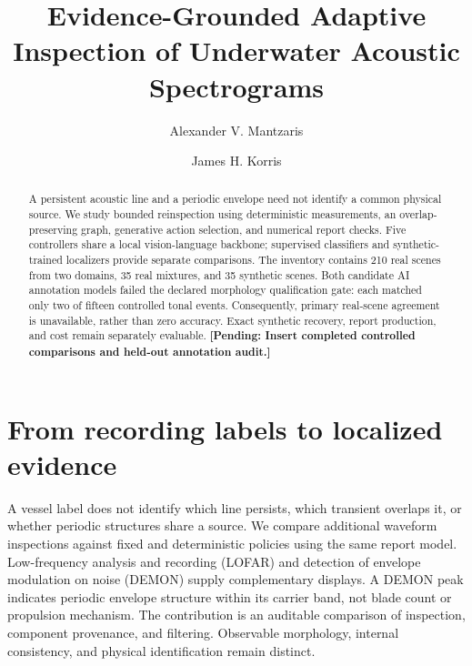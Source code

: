 \documentclass[runningheads,orivec]{llncs}
\newcommand{\pending}[1]{\iffinalresults
  \PackageError{research-results}{Unresolved result or protocol marker}{Resolve the marked item from recorded evidence before submission.}%
  \else\textbf{[Pending: #1]}\fi}
\newif\iffinalresults
\begin{document}
\raggedbottom
\title{Evidence-Grounded Adaptive Inspection of Underwater Acoustic Spectrograms}
\author{Alexander V. Mantzaris \and James H. Korris}
\maketitle

\begin{abstract}
A persistent acoustic line and a periodic envelope need not identify a common physical source. We study bounded reinspection using deterministic measurements, an overlap-preserving graph, generative action selection, and numerical report checks. Five controllers share a local vision-language backbone; supervised classifiers and synthetic-trained localizers provide separate comparisons. The inventory contains 210 real scenes from two domains, 35 real mixtures, and 35 synthetic scenes. Both candidate AI annotation models failed the declared morphology qualification gate: each matched only two of fifteen controlled tonal events. Consequently, primary real-scene agreement is unavailable, rather than zero accuracy. Exact synthetic recovery, report production, and cost remain separately evaluable. \pending{Insert completed controlled comparisons and held-out annotation audit.}
\end{abstract}

\section{From recording labels to localized evidence}
A vessel label does not identify which line persists, which transient overlaps it, or whether periodic structures share a source. We compare additional waveform inspections against fixed and deterministic policies using the same report model. Low-frequency analysis and recording (LOFAR) and detection of envelope modulation on noise (DEMON) supply complementary displays. A DEMON peak indicates periodic envelope structure within its carrier band, not blade count or propulsion mechanism. The contribution is an auditable comparison of inspection, component provenance, and filtering. Observable morphology, internal consistency, and physical identification remain distinct.
\end{document}
